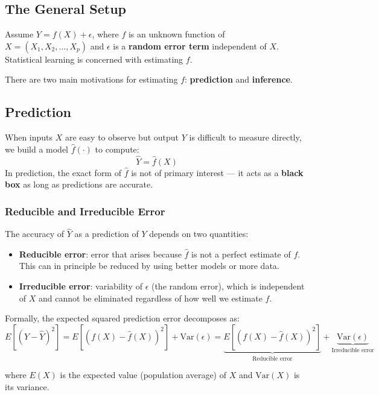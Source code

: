 \documentclass[11pt,a4paper]{article}
\theoremstyle{definition}
\theoremstyle{plain}
\theoremstyle{remark}
\begin{document}
\subsection{The General Setup}

Assume $Y = f(X) + \epsilon$, where $f$ is an unknown function of $X = (X_1, X_2, \ldots, X_p)$ and $\epsilon$ is a \textbf{random error term} independent of $X$. Statistical learning is concerned with estimating $f$.

There are two main motivations for estimating $f$: \textbf{prediction} and \textbf{inference}.

\subsection{Prediction}

When inputs $X$ are easy to observe but output $Y$ is difficult to measure directly, we build a model $\hat{f}(\cdot)$ to compute:
\[
    \hat{Y} = \hat{f}(X)
\]
In prediction, the exact form of $\hat{f}$ is not of primary interest — it acts as a \textbf{black box} as long as predictions are accurate.

\subsubsection{Reducible and Irreducible Error}

The accuracy of $\hat{Y}$ as a prediction of $Y$ depends on two quantities:

\begin{itemize}
    \item \textbf{Reducible error}: error that arises because $\hat{f}$ is not a perfect estimate of $f$. This can in principle be reduced by using better models or more data.
    \item \textbf{Irreducible error}: variability of $\epsilon$ (the random error), which is independent of $X$ and cannot be eliminated regardless of how well we estimate $f$.
\end{itemize}

Formally, the expected squared prediction error decomposes as:
\[
    E\!\left[(Y - \hat{Y})^2\right]
    = E\!\left[(f(X) - \hat{f}(X))^2\right] + \mathrm{Var}(\epsilon)
    = \underbrace{E\!\left[(f(X) - \hat{f}(X))^2\right]}_{\text{Reducible error}} + \underbrace{\mathrm{Var}(\epsilon)}_{\text{Irreducible error}}
\]

where $E(X)$ is the expected value (population average) of $X$ and $\mathrm{Var}(X)$ is its variance.
\end{document}
